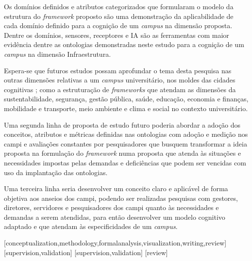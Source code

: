 \documentclass[portuguese]{textolivre}
\begin{document}
Os domínios definidos e atributos categorizados que formularam o modelo da estrutura do \textit{framework} proposto são uma demonstração da aplicabilidade de cada domínio definido para a cognição de um \textit{campus} na dimensão proposta. Dentre os domínios, sensores, receptores e IA são as ferramentas com maior evidência dentre as ontologias demonstradas neste estudo para a cognição de um \textit{campus} na dimensão Infraestrutura.

Espera-se que futuros estudos possam aprofundar o tema desta pesquisa nas outras dimensões relativas a um \textit{campus} universitário, nos moldes das cidades cognitivas \cite{giuriatti2024}; como a estruturação de \textit{frameworks} que atendam as dimensões da sustentabilidade, segurança, gestão pública, saúde, educação, economia e finanças, mobilidade e transporte, meio ambiente e clima e social no contexto universitário.

Uma segunda linha de proposta de estudo futuro poderia abordar a adoção dos conceitos, atributos e métricas definidas nas ontologias com adoção e medição nos campi e avaliações constantes por pesquisadores que busquem transformar a ideia proposta na formulação do \textit{framework} numa proposta que atenda às situações e necessidades impostas pelas demandas e deficiências que podem ser vencidas com uso da implantação das ontologias.

Uma terceira linha seria desenvolver um conceito claro e aplicável de forma objetiva aos anseios dos campi, podendo ser realizadas pesquisas com gestores, diretores, servidores e pesquisadores dos campi quanto às necessidades e demandas a serem atendidas, para então desenvolver um modelo cognitivo adaptado e que atendam às especificidades de um \textit{campus}.


\printbibliography\label{sec-bib}


\begin{contributors}
[conceptualization,methodology,formalanalysis,visualization,writing,review]
[supervision,validation]
[supervision,validation]
[review]
\end{contributors}
\end{document}
